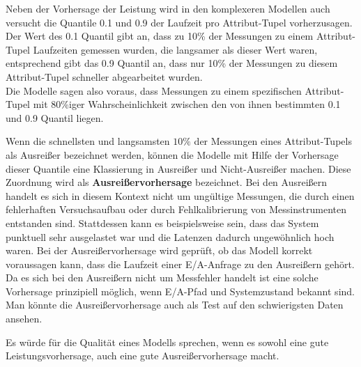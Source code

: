 \documentclass[
	12pt,
	a4paper,
	BCOR10mm,
	DIV14,
	listof=totoc,
	bibliography=totoc,
	headsepline
]{scrreprt}
\begin{document}
Neben der Vorhersage der Leistung wird in den komplexeren Modellen auch versucht die Quantile 0.1 und 0.9 der Laufzeit pro Attribut-Tupel vorherzusagen. Der Wert des 0.1 Quantil gibt an, dass zu 10\% der Messungen zu einem Attribut-Tupel Laufzeiten gemessen wurden, die langsamer als dieser Wert waren, entsprechend gibt das 0.9 Quantil an, dass nur 10\% der Messungen zu diesem Attribut-Tupel schneller abgearbeitet wurden.\\
Die Modelle sagen also voraus, dass Messungen zu einem spezifischen Attribut-Tupel mit 80\%iger Wahrscheinlichkeit zwischen den von ihnen bestimmten 0.1 und 0.9 Quantil liegen.\medskip

Wenn die schnellsten und langsamsten $10\%$ der Messungen eines Attribut-Tupels als Ausreißer bezeichnet werden, können die Modelle mit Hilfe der Vorhersage dieser Quantile eine Klassierung in Ausreißer und Nicht-Ausreißer machen. Diese Zuordnung wird als \textbf{Ausreißervorhersage} bezeichnet.
Bei den Ausreißern handelt es sich in diesem Kontext nicht um ungültige Messungen, die durch einen fehlerhaften Versuchsaufbau oder durch Fehlkalibrierung von Messinstrumenten entstanden sind. Stattdessen kann es beispielsweise sein, dass das System punktuell sehr ausgelastet war und die Latenzen dadurch ungewöhnlich hoch waren. 
Bei der Ausreißervorhersage wird geprüft, ob das Modell korrekt voraussagen kann, dass die Laufzeit einer E/A-Anfrage zu den Ausreißern gehört. Da es sich bei den Ausreißern nicht um Messfehler handelt ist eine solche Vorhersage prinzipiell möglich, wenn E/A-Pfad und Systemzustand bekannt sind.
Man könnte die Ausreißervorhersage auch als Test auf den schwierigsten Daten ansehen. 

Es würde für die Qualität eines Modells sprechen, wenn es sowohl eine gute Leistungsvorhersage, auch eine gute Ausreißervorhersage macht.
\end{document}

